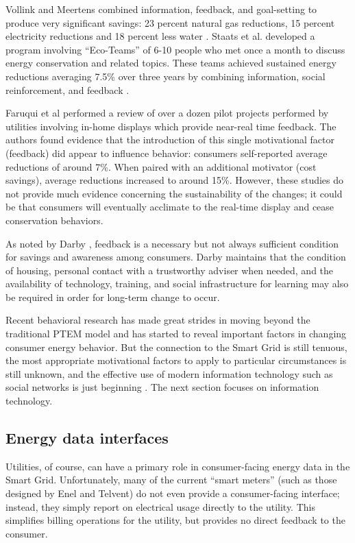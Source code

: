 Vollink and Meertens combined information, feedback, and goal-setting to
produce very significant savings: 23 percent natural gas reductions, 15
percent electricity reductions and 18 percent less water \cite{Vollink99}.
Staats et al. developed a program involving ``Eco-Teams'' of 6-10 people
who met once a month to discuss energy conservation and related
topics. These teams achieved sustained energy reductions averaging 7.5\% over
three years by combining information, social reinforcement, and feedback
\cite{Staats04}.

Faruqui et al \cite{Faruqui09} performed a review of over a dozen pilot projects
performed by utilities involving in-home displays which provide near-real
time feedback.  The authors found evidence that the introduction of this
single motivational factor (feedback) did appear to influence behavior:
consumers self-reported average reductions of around 7\%.   When paired with an
additional motivator (cost savings), average reductions increased to around
15\%.  However, these studies do not provide much evidence concerning the
sustainability of the changes; it could be that consumers will eventually
acclimate to the real-time display and cease conservation behaviors. 

As noted by Darby \cite{Darby06}, feedback is a necessary but
not always sufficient condition for savings and awareness among
consumers. Darby maintains that  the condition of housing, personal contact
with a trustworthy adviser when needed, and the availability of technology, 
training, and social infrastructure for learning may also be required 
in order for long-term change to occur.  

Recent behavioral research has made great strides in moving beyond the
traditional PTEM model and has started to reveal important factors in
changing consumer energy behavior. But the connection to the Smart Grid is
still tenuous, the most appropriate motivational factors to apply to
particular circumstances is still unknown, and the effective use of modern
information technology such as social networks is just beginning
\cite{StepGreen}.  The next section focuses on information technology.

\subsection{Energy data interfaces}

Utilities, of course, can have a primary role in consumer-facing energy
data in the Smart Grid. Unfortunately, many of the current ``smart meters''
(such as those designed by Enel and Telvent) do not even provide a
consumer-facing interface; instead, they simply report on electrical usage
directly to the utility.  This simplifies billing operations for the
utility, but provides no direct feedback to the consumer.

